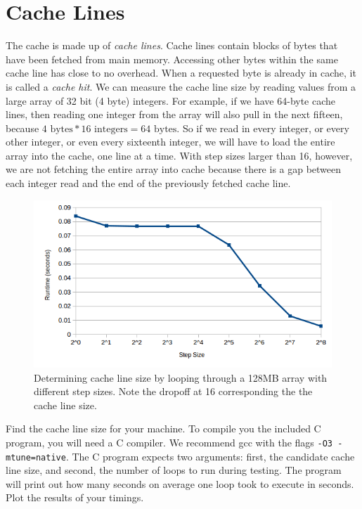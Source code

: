 \section*{Cache Lines}
The cache is made up of \emph{cache lines}.
Cache lines contain blocks of bytes that have been fetched from main memory.
Accessing other bytes within the same cache line has close to no overhead.
When a requested byte is already in cache, it is called a \emph{cache hit}.
We can measure the cache line size by reading values from a large array of 32 bit (4 byte) integers.
For example, if we have 64-byte cache lines, then reading one integer from the array will also pull in the next fifteen, because $4 \mbox{~bytes} * 16 \mbox{~integers} = 64 \mbox{~bytes}$.
So if we read in every integer, or every other integer, or even every sixteenth integer, we will have to load the entire array into the cache, one line at a time.
With step sizes larger than 16, however, we are not fetching the entire array into cache because there is a gap between each integer read and the end of the previously fetched cache line.
\begin{figure}[h]
\centering
\includegraphics[width=\textwidth]{cache_line.png}
\caption{Determining cache line size by looping through a 128MB array with different step sizes. Note the dropoff at 16 corresponding the the cache line size.}
\label{fig:linesize}
\end{figure}

\begin{problem}
Find the cache line size for your machine.
To compile you the included C program, you will need a C compiler.
We recommend gcc with the flags \texttt{-O3 -mtune=native}.
The C program expects two arguments: first, the candidate cache line size, and second, the number of loops to run during testing.
The program will print out how many seconds on average one loop took to execute in seconds.
Plot the results of your timings.
\label{prob:cacheline}
\end{problem}

